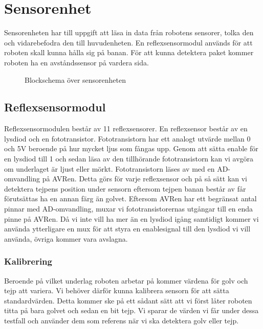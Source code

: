 %

\section{Sensorenhet}
Sensorenheten har till uppgift att läsa in data från robotens sensorer, tolka den och vidarebefodra den till huvudenheten. En reflexsensormodul används för att roboten skall kunna hålla sig på banan. För att kunna detektera paket kommer roboten ha en avståndssensor på vardera sida. \\

\begin{figure}[h]
\center
\scalebox{0.9}{}
\caption{Blockschema över sensorenheten}
\end{figure}

\subsection{Reflexsensormodul}
Reflexsensormodulen består av 11 reflexsensorer. En reflexsensor består av en lysdiod och en fototransistor. Fototransistorn har ett analogt utvärde mellan 0 och 5V beroende på hur mycket ljus som fångas upp. Genom att sätta enable för en lysdiod till 1 och sedan läsa av den tillhörande fototransistorn kan vi avgöra om underlaget är ljust eller mörkt. Fototransistorn läses av med en AD-omvandling på AVRen. Detta görs för varje reflexsensor och på så sätt kan vi detektera tejpens position under sensorn eftersom tejpen banan består av får förutsättas ha en annan färg än golvet. Eftersom AVRen har ett begränsat antal pinnar med AD-omvandling, muxar vi fototransistorernas utgångar till en enda pinne på AVRen. Då vi inte vill ha mer än en lysdiod igång samtidigt kommer vi använda ytterligare en mux för att styra en enablesignal till den lysdiod vi vill använda, övriga kommer vara avslagna.

\subsubsection{Kalibrering}
Beroende på vilket underlag roboten arbetar på kommer värdena för golv och tejp att variera. Vi behöver därför kunna kalibrera sensorn för att sätta standardvärden. Detta kommer ske på ett sådant sätt att vi först låter roboten titta på bara golvet och sedan en bit tejp. Vi sparar de värden vi får under dessa testfall och använder dem som referens när vi ska detektera golv eller tejp.

